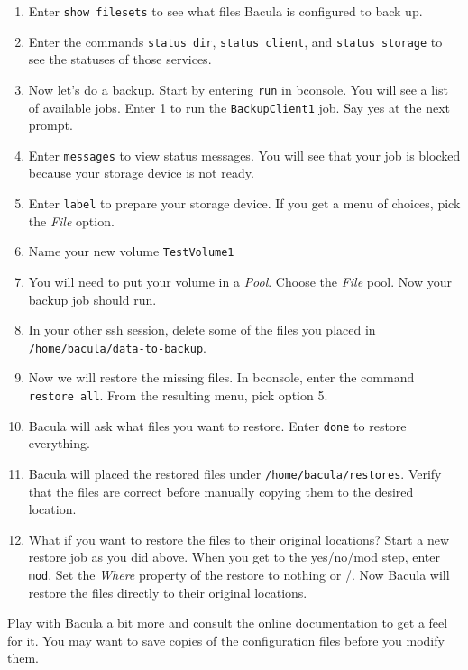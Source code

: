 \documentclass{article}   	%
\begin{document}
\begin{enumerate}
  \item Enter \texttt{show filesets} to see what files Bacula is configured to back up.

  \item Enter the commands \texttt{status dir}, \texttt{status client}, and \texttt{status storage} to see the statuses of those services.

  \item Now let's do a backup.  Start by entering \texttt{run} in bconsole.  You will see a list of available jobs.  Enter 1 to run the 
        \texttt{BackupClient1} job.  Say yes at the next prompt.

  \item Enter \texttt{messages} to view status messages.  You will see that your job is blocked because your storage device is not ready.

  \item Enter \texttt{label} to prepare your storage device. If you get a menu of choices, pick the \emph{File} option.

  \item Name your new volume \texttt{TestVolume1}

  \item You will need to put your volume in a \emph{Pool}.  Choose the \emph{File} pool.  Now your backup job should run.

  \item In your other ssh session, delete some of the files you placed in \texttt{/home/bacula/data-to-backup}.

  \item Now we will restore the missing files.  In bconsole, enter the command \texttt{restore all}.  From the 
        resulting menu, pick option 5.

  \item Bacula will ask what files you want to restore.  Enter \texttt{done} to restore everything.

  \item Bacula will placed the restored files under \texttt{/home/bacula/restores}.  Verify that the files are correct
        before manually copying them to the desired location.

  \item What if you want to restore the files to their original locations?  Start a new restore job as you did above.
        When you get to the yes/no/mod step, enter \texttt{mod}. Set the \emph{Where} property of the restore to 
	nothing or /.  Now Bacula will restore the files directly to their original locations. 

\end{enumerate}

Play with Bacula a bit more and consult the online documentation to get a feel for it.  You may want to save copies of the configuration files before you modify them.
\end{document}
